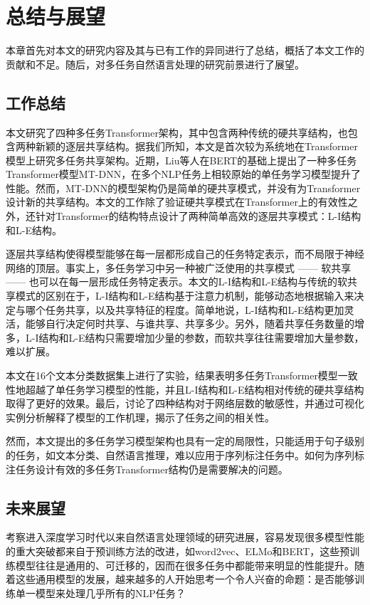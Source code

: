 \chapter{总结与展望}
\label{cha:conclusions}
本章首先对本文的研究内容及其与已有工作的异同进行了总结，概括了本文工作的贡献和不足。随后，对多任务自然语言处理的研究前景进行了展望。

\section{工作总结}
本文研究了四种多任务Transformer架构，其中包含两种传统的硬共享结构，也包含两种新颖的逐层共享结构。据我们所知，本文是首次较为系统地在Transformer模型上研究多任务共享架构。近期，Liu等人\cite{liu2019multi}在BERT\cite{devlin2018bert}的基础上提出了一种多任务Transformer模型MT-DNN，在多个NLP任务上相较原始的单任务学习模型提升了性能。然而，MT-DNN的模型架构仍是简单的硬共享模式，并没有为Transformer设计新的共享结构。本文的工作除了验证硬共享模式在Transformer上的有效性之外，还针对Transformer的结构特点设计了两种简单高效的逐层共享模式：L-I结构和L-E结构。

逐层共享结构使得模型能够在每一层都形成自己的任务特定表示，而不局限于神经网络的顶层。事实上，多任务学习中另一种被广泛使用的共享模式 —— 软共享 —— 也可以在每一层形成任务特定表示。本文的L-I结构和L-E结构与传统的软共享模式的区别在于，L-I结构和L-E结构基于注意力机制，能够动态地根据输入来决定与哪个任务共享，以及共享特征的程度。简单地说，L-I结构和L-E结构更加灵活，能够自行决定何时共享、与谁共享、共享多少。另外，随着共享任务数量的增多，L-I结构和L-E结构只需要增加少量的参数，而软共享往往需要增加大量参数，难以扩展。

本文在16个文本分类数据集上进行了实验，结果表明多任务Transformer模型一致性地超越了单任务学习模型的性能，并且L-I结构和L-E结构相对传统的硬共享结构取得了更好的效果。最后，讨论了四种结构对于网络层数的敏感性，并通过可视化实例分析解释了模型的工作机理，揭示了任务之间的相关性。

然而，本文提出的多任务学习模型架构也具有一定的局限性，只能适用于句子级别的任务，如文本分类、自然语言推理，难以应用于序列标注任务中。如何为序列标注任务设计有效的多任务Transformer结构仍是需要解决的问题。

\section{未来展望}
考察进入深度学习时代以来自然语言处理领域的研究进展，容易发现很多模型性能的重大突破都来自于预训练方法的改进，如word2vec\cite{DBLP:conf/nips/MikolovSCCD13}、ELMo\cite{DBLP:conf/naacl/PetersNIGCLZ18}和BERT\cite{devlin2018bert}，这些预训练模型往往是通用的、可迁移的，因而在很多任务中都能带来明显的性能提升。随着这些通用模型的发展，越来越多的人开始思考一个令人兴奋的命题：是否能够训练单一模型来处理几乎所有的NLP任务？

